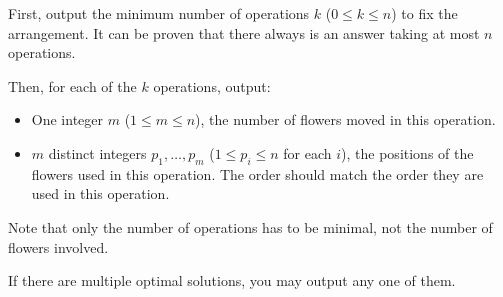 
    First, output the minimum number of operations $k$ ($0 \leq k \leq n$) to fix the arrangement. It can be proven that there always is an answer taking at most $n$ operations.

    Then, for each of the $k$ operations, output:
    \begin{itemize}
      \item One integer $m$ ($1 \leq m \leq n$), the number of flowers moved in this operation.
      \item $m$ distinct integers $p_1, \ldots, p_m$ ($1 \leq p_i \leq n$ for each $i$), the positions of the flowers used in this operation. The order should match the order they are used in this operation.
    \end{itemize}

    Note that only the number of operations has to be minimal, not the number of flowers involved.

    If there are multiple optimal solutions, you may output any one of them.
